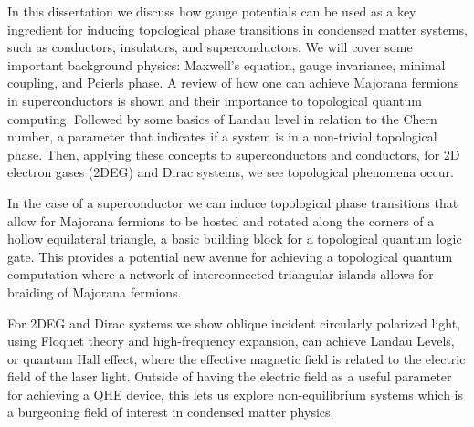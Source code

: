In this dissertation we discuss how gauge potentials can be used as a key ingredient for inducing topological phase transitions in condensed matter systems, such as conductors, insulators, and superconductors.
We will cover some important background physics: Maxwell's equation, gauge invariance, minimal coupling, and Peierls phase.
A review of how one can achieve Majorana fermions in superconductors is shown and their importance to topological quantum computing.
Followed by some basics of Landau level in relation to the Chern number, a parameter that indicates if a system is in a non-trivial topological phase.
Then, applying these concepts to superconductors and conductors, for 2D electron gases (2DEG) and Dirac systems, we see topological phenomena occur.

In the case of a superconductor we can induce topological phase transitions that allow for Majorana fermions to be hosted and rotated along the corners of a hollow equilateral triangle, a basic building block for a topological quantum logic gate.
This provides a potential new avenue for achieving a topological quantum computation where a network of interconnected triangular islands allows for braiding of Majorana fermions.

For 2DEG and Dirac systems we show oblique incident circularly polarized light, using Floquet theory and high-frequency expansion, can achieve Landau Levels, or quantum Hall effect, where the effective magnetic field is related to the electric field of the laser light.
Outside of having the electric field as a useful parameter for achieving a QHE device, this lets us explore non-equilibrium systems which is a burgeoning field of interest in condensed matter physics.
